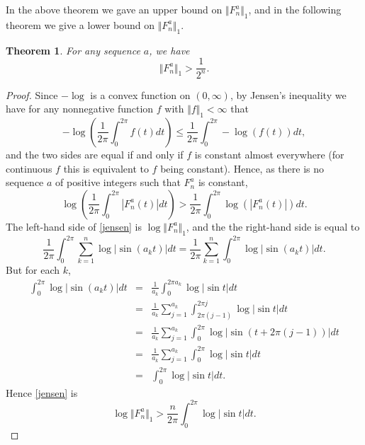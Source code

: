 \documentclass{amsart}
\newcommand{\norm}[1]{\Vert #1 \Vert}
\newtheorem{theorem}{Theorem}
\begin{document}
In the above theorem we gave an upper bound on $\norm{F_n^a}_1$, and in the following theorem we give a lower bound on
$\norm{F_n^a}_1$.

\begin{theorem} 
For any sequence $a$, we have
\[
\norm{F_n^a}_1 > \frac{1}{2^n}.
\]
\label{lowerbound}
\end{theorem}
\begin{proof}
Since $-\log$ is a convex function on $(0,\infty)$, by Jensen's inequality \cite[p.~44, Theorem 2.2]{lieb} 
we have for any nonnegative function $f$ with $\norm{f}_1 < \infty$ that
\[
-\log \left(\frac{1}{2\pi} \int_0^{2\pi} f(t) dt \right) \leq \frac{1}{2\pi} \int_0^{2\pi} -\log(f(t)) dt,
\]
and the two sides are equal if and only if $f$ is constant almost everywhere (for continuous $f$ this is equivalent to $f$ being constant).
Hence, as there is no sequence $a$ of positive integers such that $F_n^a$ is constant,
\begin{equation}
\log\left( \frac{1}{2\pi} \int_0^{2\pi} |F_n^a(t)| dt \right)
> \frac{1}{2\pi} \int_0^{2\pi} \log(|F_n^a(t)|) dt.
\label{jensen}
\end{equation}
The left-hand side of \eqref{jensen} is $\log \norm{F_n^a}_1$, and the
the right-hand side is equal to
\[
\frac{1}{2\pi} \int_0^{2\pi} \sum_{k=1}^n \log |\sin(a_k t)| dt=
\frac{1}{2\pi} \sum_{k=1}^n \int_0^{2\pi} \log|\sin (a_kt)| dt.
\]
But for each $k$,
\begin{eqnarray*}
\int_0^{2\pi} \log|\sin (a_kt)|dt&=&\frac{1}{a_k} \int_0^{2\pi a_k} \log |\sin t| dt\\
&=&\frac{1}{a_k} \sum_{j=1}^{a_k} \int_{2\pi(j-1)}^{2\pi j} \log|\sin t| dt\\
&=&\frac{1}{a_k} \sum_{j=1}^{a_k} \int_0^{2\pi} \log|\sin(t+2\pi(j-1))| dt  \\
&=&\frac{1}{a_k} \sum_{j=1}^{a_k} \int_0^{2\pi} \log |\sin t| dt\\
&=&\int_0^{2\pi} \log|\sin t|dt.
\end{eqnarray*}
Hence  \eqref{jensen} is
\[
\log \norm{F_n^a}_1 > \frac{n}{2\pi} \int_0^{2\pi} \log|\sin t|dt.
\]


\end{proof}
\end{document}
